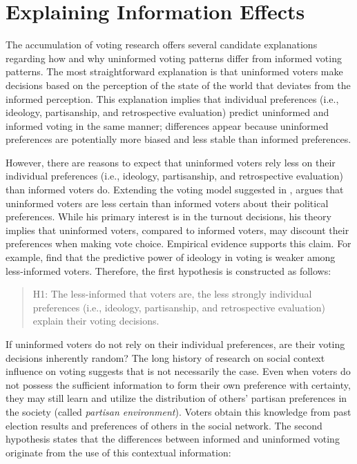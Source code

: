 \documentclass[letterpaper, 12pt]{article}
\begin{document}
    \section*{Explaining Information Effects}

    \par The accumulation of voting research offers several candidate explanations regarding how and why uninformed voting patterns differ from informed voting patterns. The most straightforward explanation is that uninformed voters make decisions based on the perception of the state of the world that deviates from the informed perception. This explanation implies that individual preferences (i.e., ideology, partisanship, and retrospective evaluation) predict uninformed and informed voting in the same manner; differences appear because uninformed preferences are potentially more biased and less stable than informed preferences.

    \par However, there are reasons to expect that uninformed voters rely less on their individual preferences (i.e., ideology, partisanship, and retrospective evaluation) than informed voters do. Extending the voting model suggested in \cite{Downs1957anec}, \cite{Matsusaka1995exvo} argues that uninformed voters are less certain than informed voters about their political preferences. While his primary interest is in the turnout decisions, his theory implies that uninformed voters, compared to informed voters, may discount their preferences when making vote choice. Empirical evidence supports this claim. For example, \cite{Dellicarpini1996wham} find that the predictive power of ideology in voting is weaker among less-informed voters. Therefore, the first hypothesis is constructed as follows:

    \begin{verse}
        H1: The less-informed that voters are, the less strongly individual preferences (i.e., ideology, partisanship, and retrospective evaluation) explain their voting decisions. 
    \end{verse}

    \par If uninformed voters do not rely on their individual preferences, are their voting decisions inherently random? The long history of research on social context influence on voting suggests that is not necessarily the case. Even when voters do not possess the sufficient information to form their own preference with certainty, they may still learn and utilize the distribution of others' partisan preferences in the society (called \textit{partisan environment}). Voters obtain this knowledge from past election results and preferences of others in the social network. The second hypothesis states that the differences between informed and uninformed voting originate from the use of this contextual information:
\end{document}
